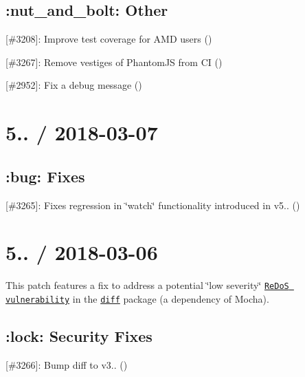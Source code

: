 \subsection*{\+:nut\+\_\+and\+\_\+bolt\+: Other}


\begin{DoxyItemize}
\item \mbox{[}\#3208\mbox{]}\+: Improve test coverage for A\+MD users (\href{https://github.com/outsideris}{\tt })
\item \mbox{[}\#3267\mbox{]}\+: Remove vestiges of Phantom\+JS from CI (\href{https://github.com/anishkny}{\tt })
\item \mbox{[}\#2952\mbox{]}\+: Fix a debug message (\href{https://github.com/boneskull}{\tt })
\end{DoxyItemize}

\section*{5.. / 2018-\/03-\/07}

\subsection*{\+:bug\+: Fixes}


\begin{DoxyItemize}
\item \mbox{[}\#3265\mbox{]}\+: Fixes regression in \char`\"{}watch\char`\"{} functionality introduced in v5.. (\href{https://github.com/outsideris}{\tt })
\end{DoxyItemize}

\section*{5.. / 2018-\/03-\/06}

This patch features a fix to address a potential \char`\"{}low severity\char`\"{} \href{https://snyk.io/vuln/npm:diff:20180305}{\tt Re\+DoS vulnerability} in the \href{https://npm.im/diff}{\tt diff} package (a dependency of Mocha).

\subsection*{\+:lock\+: Security Fixes}


\begin{DoxyItemize}
\item \mbox{[}\#3266\mbox{]}\+: Bump {\ttfamily diff} to v3.. (\href{https://github.com/anishkny}{\tt })
\end{DoxyItemize}

